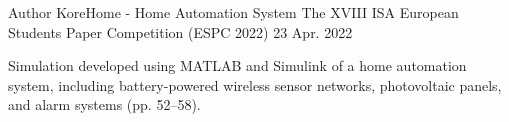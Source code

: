 

\begin{cventries}

  \cventry
    {Author} %
    {KoreHome - Home Automation System} %
    {The XVIII ISA European Students Paper Competition (ESPC 2022)} %
    {23 Apr. 2022} %
    {
      \begin{cvitems}
        \item {Simulation developed using MATLAB and Simulink of a home automation system, including battery-powered wireless sensor networks, photovoltaic panels, and alarm systems (pp. 52--58).}
        \\
      \end{cvitems}
    }

\end{cventries}
